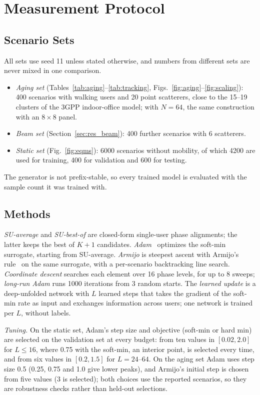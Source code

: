 \section{Measurement Protocol}
\label{sec:method}

\subsection{Scenario Sets}
All sets use seed 11 unless stated otherwise, and numbers from different sets are never mixed in one comparison.
\begin{itemize}
    \item \emph{Aging set} (Tables~\ref{tab:aging}--\ref{tab:tracking}, Figs.~\ref{fig:aging}--\ref{fig:scaling}): 400 scenarios with walking users and 20 point scatterers, close to the 15--19 clusters of the 3GPP indoor-office model; with $N=64$, the same construction with an $8\times 8$ panel.
    \item \emph{Beam set} (Section~\ref{sec:res_beam}): 400 further scenarios with 6 scatterers.
    \item \emph{Static set} (Fig.~\ref{fig:eqms}): 6000 scenarios without mobility, of which 4200 are used for training, 400 for validation and 600 for testing.
\end{itemize}
The generator is not prefix-stable, so every trained model is evaluated with the sample count it was trained with.

\subsection{Methods}
\emph{SU-average} and \emph{SU-best-of} are closed-form single-user phase alignments; the latter keeps the best of $K{+}1$ candidates. \emph{Adam}~\cite{Kingma2015ICLR} optimizes the soft-min surrogate, starting from SU-average. \emph{Armijo} is steepest ascent with Armijo's rule~\cite{Armijo1966PJM} on the same surrogate, with a per-scenario backtracking line search. \emph{Coordinate descent} searches each element over 16 phase levels, for up to 8 sweeps; \emph{long-run Adam} runs 1000 iterations from 3 random starts. The \emph{learned update} is a deep-unfolded network with $L$ learned steps that takes the gradient of the soft-min rate as input and exchanges information across users; one network is trained per $L$, without labels.

\emph{Tuning.} On the static set, Adam's step size and objective (soft-min or hard min) are selected on the validation set at every budget: from ten values in $[0.02, 2.0]$ for $L\le 16$, where 0.75 with the soft-min, an interior point, is selected every time, and from six values in $[0.2, 1.5]$ for $L=24$--$64$. On the aging set Adam uses step size 0.5 (0.25, 0.75 and 1.0 give lower peaks), and Armijo's initial step is chosen from five values (3 is selected); both choices use the reported scenarios, so they are robustness checks rather than held-out selections.

